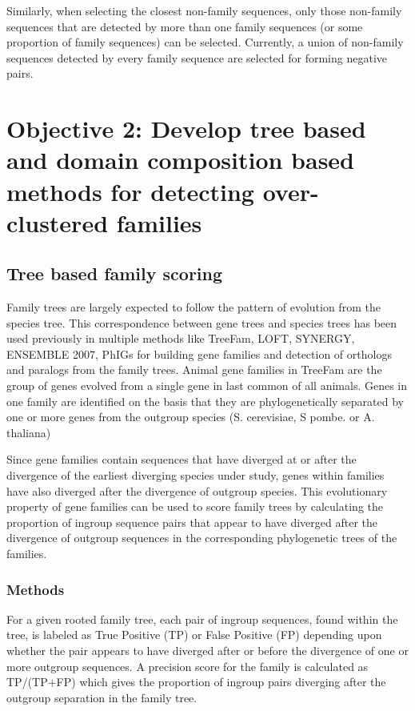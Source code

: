 \documentclass{article}
\begin{document}
			Similarly, when selecting the closest non-family sequences, only those non-family sequences that are detected by more than one family sequences (or some proportion of family sequences) can be selected. Currently, a union of non-family sequences detected by every family sequence are selected for forming negative pairs.
			
			\pagebreak
	
	\section{Objective 2: Develop tree based and domain composition based methods for detecting over-clustered families}	
	\subsection{Tree based family scoring}
	Family trees are largely expected to follow the pattern of evolution from the species tree. This correspondence between gene trees and species trees has been used previously in multiple methods like TreeFam, LOFT, SYNERGY, ENSEMBLE 2007, PhIGs \citep{li2006treefam,van2007orthology,wapinski2007automatic,hubbard2006ensembl,dehal2006phylogenomic} for building gene families and detection of orthologs and paralogs from the family trees. Animal gene families in TreeFam are the group of genes evolved from a single gene in last common of all animals. Genes in one family are identified on the basis that they are phylogenetically separated by one or more genes from the outgroup species (S. cerevisiae, S pombe. or A. thaliana)
	
	Since gene families contain sequences that have diverged at or after the divergence of the earliest diverging species under study, genes within families have also diverged after the divergence of outgroup species. This evolutionary property of gene families can be used to score family trees by calculating the proportion of ingroup sequence pairs that appear to have diverged after the divergence of outgroup sequences in the corresponding phylogenetic trees of the families.
		\subsubsection{Methods}
		For a given rooted family tree, each pair of ingroup sequences, found within the tree, is labeled as True Positive (TP) or False Positive (FP) depending upon whether the pair appears to have diverged after or before the divergence of one or more outgroup sequences. A precision score for the family is calculated  as TP/(TP+FP) which gives the proportion of ingroup pairs diverging after the outgroup separation in the family tree.
		
\end{document}

